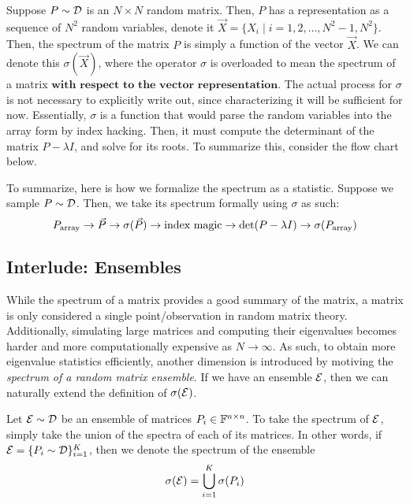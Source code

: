 \begin{formalization}
Suppose $P \sim \mathcal{D}$ is an $N \times N$ random matrix. Then, $P$ has a representation as a sequence of $N^2$ random variables, denote it $\vec{X} = \{X_i \mid i = 1,2,\dots,N^2 - 1,N^2\}$. Then, the spectrum of the matrix $P$ is simply a function of the vector $\vec{X}$. We can denote this $\sigma(\vec{X})$, where the operator $\sigma$ is overloaded to mean the spectrum of a matrix $\textbf{with respect to the vector representation}$. The actual process for $\sigma$ is not necessary to explicitly write out, since characterizing it will be sufficient for now. Essentially, $\sigma$ is a function that would parse the random variables into the array form by index hacking. Then, it must compute the determinant of the matrix $P - \lambda I$, and solve for its roots. To summarize this, consider the flow chart below.
\end{formalization}

To summarize, here is how we formalize the spectrum as a statistic. Suppose we sample $P \sim \mathcal{D}$. Then, we take its spectrum formally using $\sigma$ as such:\hfill
$$P_{\text{array}} \rightarrow \vec{P} \rightarrow \sigma(\vec{P}) \rightarrow \text{index magic} \rightarrow \det(P - \lambda I) \rightarrow \sigma(P_{\text{array}})$$


\subsection{Interlude: Ensembles}
While the spectrum of a matrix provides a good summary of the matrix, a matrix is only considered a single point/observation in random matrix theory. Additionally, simulating large matrices and computing their eigenvalues becomes harder and more computationally expensive as $N \to \infty$. As such, to obtain more eigenvalue statistics efficiently, another dimension is introduced by motiving the \textit{spectrum of a random matrix ensemble}. If we have an ensemble $\mathcal{E}$, then we can naturally extend the definition of $\sigma(\mathcal{E})$.

\begin{definition}
Let $\mathcal{E} \sim \mathcal{D}$ be an ensemble of matrices $P_i \in \mathbb{F}^{n \times n}$. To take the spectrum of $\mathcal{E}$, simply take the union of the spectra of each of its matrices. In other words, if $\mathcal{E} = \{P_i \sim \mathcal{D}\}_{i = 1}^K$, then we denote the spectrum of the ensemble
$$\sigma(\mathcal{E}) = \bigcup_{i=1}^K \sigma(P_i)$$
\end{definition}

